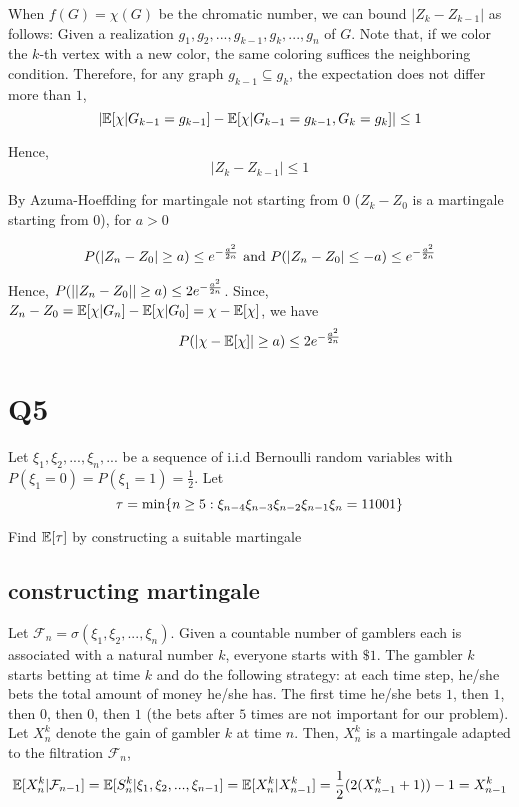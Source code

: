 \documentclass{article}
\begin{document}
When $f(G) = \chi(G)$ be the chromatic number, we can bound $|Z_k - Z_{k-1}|$ as follows: Given a realization $g_1, g_2, ..., g_{k-1}, g_k, ..., g_n$ of $G$.  Note that, if we color the $k$-th vertex with a new color, the same coloring suffices the neighboring condition. Therefore, for any graph $g_{k-1} \subseteq g_k$, the expectation does not differ more than $1$,
$$
	\lvert\mathbb{E}[\chi | G_{k-1} = g_{k-1}] - \mathbb{E}[\chi | G_{k-1} = g_{k-1}, G_k = g_k] \rvert \leq 1
$$

Hence,
$$
	|Z_k - Z_{k-1}| \leq 1
$$

By Azuma-Hoeffding for martingale not starting from $0$ ($Z_k - Z_0$ is a martingale starting from $0$), for $a > 0$

$$
	P\tuple*{|Z_n - Z_0| \geq a} \leq e^{- \frac{a^2}{2n}} \text{ and } P\tuple*{|Z_n - Z_0| \leq -a} \leq e^{- \frac{a^2}{2n}}
$$

Hence, $P\tuple*{||Z_n - Z_0|| \geq a} \leq 2e^{- \frac{a^2}{2n}}$. Since, $Z_n - Z_0 = \mathbb{E}[\chi | G_n] - \mathbb{E}[\chi | G_0]= \chi - \mathbb{E}[\chi]$, we have
$$
P(|\chi - \mathbb{E}[\chi]| \geq a) \leq 2 e^{- \frac{a^2}{2n}}
$$

\section{Q5}

Let $\xi_1, \xi_2, ..., \xi_n, ...$ be a sequence of i.i.d Bernoulli random variables with $P(\xi_1 = 0) = P(\xi_1 = 1) = \frac{1}{2}$. Let
$$
	\tau = \min\{n \geq 5: \xi_{n-4} \xi_{n-3} \xi_{n-2} \xi_{n-1} \xi_n = 11001\}
$$

Find $\mathbb{E}[\tau]$ by constructing a suitable martingale

\subsection{constructing martingale}

Let $\mathcal{F}_n = \sigma(\xi_1, \xi_2, ..., \xi_n)$. Given a countable number of gamblers each is associated with a natural number $k$, everyone starts with $\$1$. The gambler $k$ starts betting at time $k$ and do the following strategy: at each time step, he/she bets the total amount of money he/she has. The first time he/she bets $1$, then $1$, then $0$, then $0$, then $1$ (the bets after $5$ times are not important for our problem). Let $X^k_n$ denote the gain of gambler $k$ at time $n$. Then, $X^k_n$ is a martingale adapted to the filtration $\mathcal{F}_n$,
$$
	\mathbb{E}[X^k_n | \mathcal{F}_{n-1}] = \mathbb{E}[S^k_n | \xi_1, \xi_2, ..., \xi_{n-1}] =  \mathbb{E}[X^k_n | X^k_{n-1}] = \frac{1}{2} (2 (X^k_{n-1} + 1)) - 1 = X^k_{n-1}
$$
\end{document}
